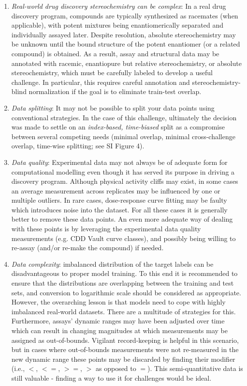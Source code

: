 \documentclass[journal=jcim,manuscript=article]{achemso}
\begin{document}
\begin{enumerate}
    \item \textit{Real-world drug discovery stereochemistry can be complex}: In a real drug discovery program, compounds are typically synthesized as racemates (when applicable), with potent mixtures being enantiomerically separated and individually assayed later. Despite resolution, absolute stereochemistry may be unknown until the bound structure of the potent enantiomer (or a related compound) is obtained. As a result, assay and structural data may be annotated with racemic, enantiopure but relative stereochemistry, or absolute stereochemistry, which must be carefully labeled to develop a useful challenge. In particular, this requires careful annotation and stereochemistry-blind normalization if the goal is to eliminate train-test overlap.
    \item \textit{Data splitting}: It may not be possible to split your data points using conventional strategies. In the case of this challenge, ultimately the decision was made to settle on an \textit{index-based, time-biased} split as a compromise between several competing needs (minimal overlap, minimal cross-challenge overlap, time-wise splitting; see SI Figure 4). 
    \item \textit{Data quality}: Experimental data may not always be of adequate form for computational modelling even though it has served its purpose in driving a discovery program. Although physical activity cliffs may exist, in some cases an average measurement across replicates may be influenced by one or multiple outliers. In rare cases, dose-response curve fitting may be faulty which introduces noise into the dataset. For all these cases it is generally better to remove these data points. An even more adequate way of dealing with these points is by leveraging the experimental data quality measurements (e.g. CDD Vault curve classes), and possibly being willing to re-assay (and/or re-make the compound) if needed.
    \item \textit{Data complexity}: imbalanced distribution of the target labels can be disadvantageous to proper model training. To this end it is recommended to ensure that the distributions are overlapping between the training and test sets, and conversion to logarithmic scale should be considered as appropriate. However, the overarching lesson is that models need to cope with highly imbalanced real-world datasets. There are a multitude of strategies for this. Furthermore, assays' dynamic ranges may have been adjusted over time which can result in changing magnitudes at which measurements may be assigned as out-of-bounds. Vigilant record-keeping is helpful in this scenario, but in cases where out-of-bounds measurements were not re-measured in the new dynamic range these points may be discarded by finding their modifier (i.e., $<$, $<=$, $>=$, $>$ as opposed to $=$). This semi-quantitative data is still valuable - finding a way to use it for challenges would be ideal.
\end{enumerate}
\end{document}
